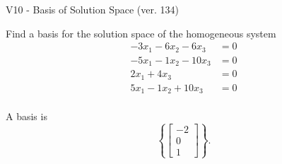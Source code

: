 \begin{exercise}
  \begin{exerciseTitle}V10 - Basis of Solution Space (ver. 134)\end{exerciseTitle}
  \begin{exerciseStatement}
    Find a basis for the solution space of the homogeneous system 
\begin{align*}
 -3 x_ 1 -6 x_ 2 -6 x_ 3 &= 0  \\ 
  -5 x_ 1 -1 x_ 2 -10 x_ 3 &= 0  \\ 
  2 x_ 1 + 4 x_ 3 &= 0  \\ 
  5 x_ 1 -1 x_ 2 + 10 x_ 3 &= 0  \\ 
 \end{align*}


 
  \end{exerciseStatement}

  \begin{exerciseAnswer}
   A basis is   
\[\left\{\left[\begin{array}{c}
-2 \\
0 \\
1
\end{array}\right]\right\}.\]

  


  \end{exerciseAnswer}
\end{exercise}